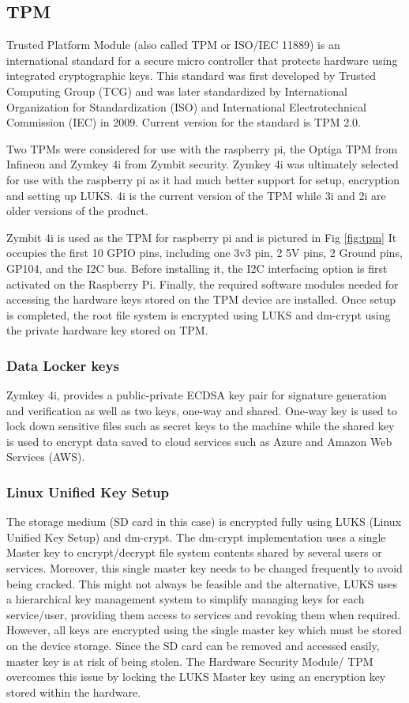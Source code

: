 \documentclass[11pt,openright]{report}
\begin{document}
\subsection{TPM}
Trusted Platform Module (also called TPM or ISO/IEC 11889) \cite{article} is an international standard for a secure micro controller that protects hardware using integrated cryptographic keys. This standard was first developed by Trusted Computing Group (TCG) and was later standardized by International Organization for Standardization (ISO) and International Electrotechnical Commission (IEC) in 2009. Current version for the standard is TPM 2.0.

Two TPMs were considered for use with the raspberry pi, the Optiga TPM from Infineon and Zymkey 4i from Zymbit security. Zymkey 4i was ultimately selected for use with the raspberry pi as it had much better support for setup, encryption and setting up LUKS. 4i is the current version of the TPM while 3i and 2i are older versions of the product.

Zymbit 4i is used as the TPM for raspberry pi and is pictured in Fig \ref{fig:tpm}  It occupies the first 10 GPIO pins, including one 3v3 pin, 2 5V pins, 2 Ground pins, GP104, and the I2C bus. Before installing it, the I2C interfacing option is first activated on the Raspberry Pi. Finally, the required software modules needed for accessing the hardware keys stored on the TPM device are installed. Once setup is completed, the root file system is encrypted using LUKS and dm-crypt using the private hardware key stored on TPM.

\subsubsection{Data Locker keys}
Zymkey 4i, provides a public-private ECDSA key pair for signature generation and verification as well as two keys, one-way and shared. One-way key is used to lock down sensitive files such as secret keys to the machine while the shared key is used to encrypt data saved to cloud services such as Azure and Amazon Web Services (AWS). 

\subsubsection{Linux Unified Key Setup}
The storage medium (SD card in this case) is encrypted fully using LUKS \cite{cryptoeprint:2016:274} (Linux Unified Key Setup) and dm-crypt. The dm-crypt implementation uses a single Master key to encrypt/decrypt file system contents shared by several users or services. Moreover, this single master key needs to be changed frequently to avoid being cracked. This might not always be feasible and the alternative, LUKS uses a hierarchical key management system to simplify managing keys for each service/user, providing them access to services and revoking them when required. However, all keys are encrypted using the single master key which must be stored on the device storage. Since the SD card can be removed and accessed easily, master key is at risk of being stolen. The Hardware Security Module/ TPM overcomes this issue by locking the LUKS Master key using an encryption key stored within the hardware.
\end{document}
